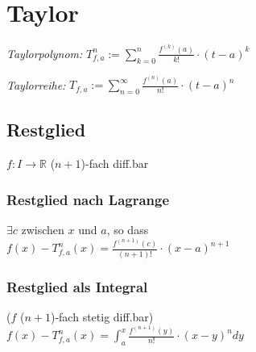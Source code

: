 \section*{Taylor}

\textit{Taylorpolynom:}
$\displaystyle T_{f,a}^n := \sum_{k=0}^n\frac{f^{(k)}(a)}{k!}\cdot(t-a)^k$

\textit{Taylorreihe:}
$\displaystyle T_{f,a} := \sum_{n=0}^\infty\frac{f^{(n)}(a)}{n!}\cdot(t-a)^n$

\subsection*{Restglied}
$f: I\to\mathbb{R}$ ($n+1$)-fach diff.bar

\subsubsection*{Restglied nach Lagrange}
$\exists c$ zwischen $x$ und $a$, so dass \\
$f(x)-T_{f,a}^n(x)=\frac{f^{(n+1)}(c)}{(n+1)!}\cdot(x-a)^{n+1}$

\subsubsection*{Restglied als Integral}
($f$ ($n+1$)-fach stetig diff.bar)\\
$f(x)-T_{f,a}^n(x)=\int_a^x\frac{f^{(n+1)}(y)}{n!}\cdot(x-y)^ndy$
